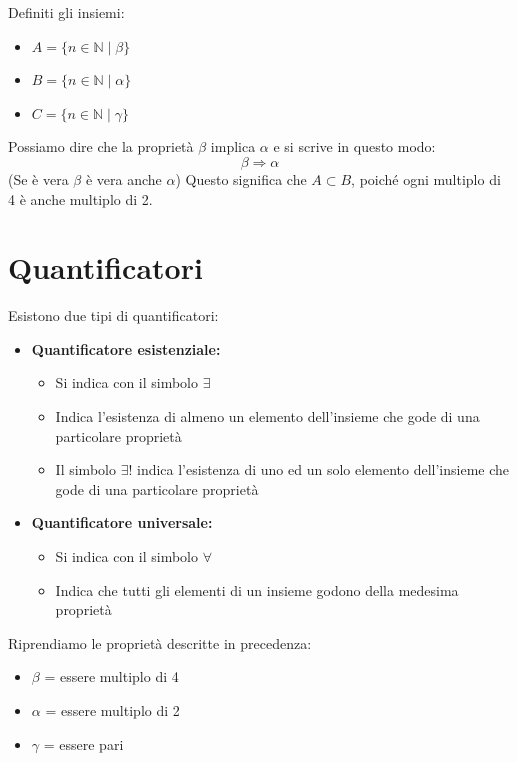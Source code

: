 \documentclass[oneside,10pt]{book} %
\newcommand{\sub}{\subset}
\newcommand{\N}{\mathbb{N}}
\begin{document}
Definiti gli insiemi:
\begin{itemize}
    \item $A = \{n \in \N \mid \beta\}$
    \item $B = \{n \in \N \mid \alpha\}$
    \item $C = \{n \in \N \mid \gamma\}$
\end{itemize}

Possiamo dire che la proprietà $\beta$ implica $\alpha$ e si scrive in questo modo:
\[
\beta \Rightarrow \alpha
\]
(Se è vera $\beta$ è vera anche $\alpha$)
Questo significa che $A \sub B$, poiché ogni multiplo di 4 è anche multiplo di 2.

\section{Quantificatori}


Esistono due tipi di quantificatori:
\begin{itemize}
    \item \textbf{Quantificatore esistenziale:}
    \begin{itemize}
        \item Si indica con il simbolo $\exists$
        \item Indica l'esistenza di almeno un elemento dell'insieme che gode di una particolare proprietà
        \item Il simbolo $\exists!$ indica l'esistenza di uno ed un solo elemento dell'insieme che gode di una particolare proprietà
    \end{itemize}
    \item \textbf{Quantificatore universale:}
    \begin{itemize}
        \item Si indica con il simbolo $\forall$
        \item Indica che tutti gli elementi di un insieme godono della medesima proprietà
    \end{itemize}
\end{itemize}

Riprendiamo le proprietà descritte in precedenza:
\begin{itemize}
    \item $\beta$ = essere multiplo di 4
    \item $\alpha$ = essere multiplo di 2
    \item $\gamma$ = essere pari
\end{itemize}
\end{document}
